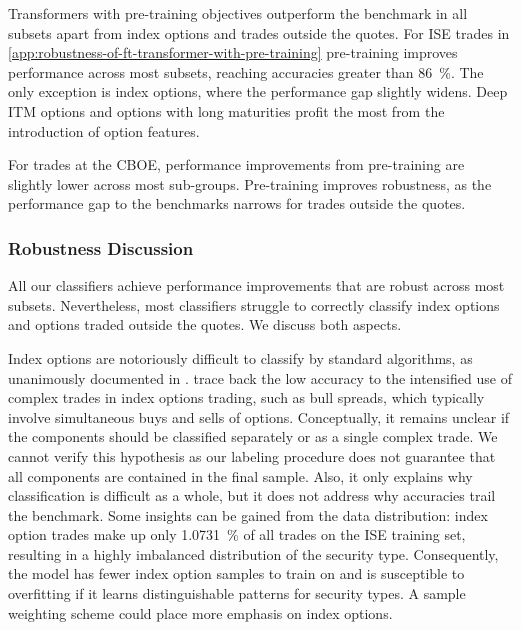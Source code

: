 Transformers with pre-training objectives outperform the benchmark in all subsets apart from index options and trades outside the quotes. For \gls{ISE} trades in \cref{app:robustness-of-ft-transformer-with-pre-training} pre-training improves performance across most subsets, reaching accuracies greater than \SI{86}{\percent}. The only exception is index options, where the performance gap slightly widens. Deep \gls{ITM} options and options with long maturities profit the most from the introduction of option features. 

For trades at the \gls{CBOE}, performance improvements from pre-training are slightly lower across most sub-groups. Pre-training improves robustness, as the performance gap to the benchmarks narrows for trades outside the quotes.

\subsubsection{Robustness Discussion}\label{sec:robustness-discussion}

All our classifiers achieve performance improvements that are robust across most subsets. Nevertheless, most classifiers struggle to correctly classify index options and options traded outside the quotes. We discuss both aspects.

Index options are notoriously difficult to classify by standard algorithms, as unanimously documented in \textcites[][898--899]{savickasInferringDirectionOption2003}[][22]{grauerOptionTradeClassification2022}. \textcite[][898--898]{savickasInferringDirectionOption2003} trace back the low accuracy to the intensified use of complex trades in index options trading, such as bull spreads, which typically involve simultaneous buys and sells of options. Conceptually, it remains unclear if the components should be classified separately or as a single complex trade. We cannot verify this hypothesis as our labeling procedure does not guarantee that all components are contained in the final sample. Also, it only explains why classification is difficult as a whole, but it does not address why accuracies trail the benchmark. Some insights can be gained from the data distribution: index option trades make up only \SI{1.0731}{\percent} of all trades on the \gls{ISE} training set, resulting in a highly imbalanced distribution of the security type. Consequently, the model has fewer index option samples to train on and is susceptible to overfitting if it learns distinguishable patterns for security types. A sample weighting scheme could place more emphasis on index options. 

